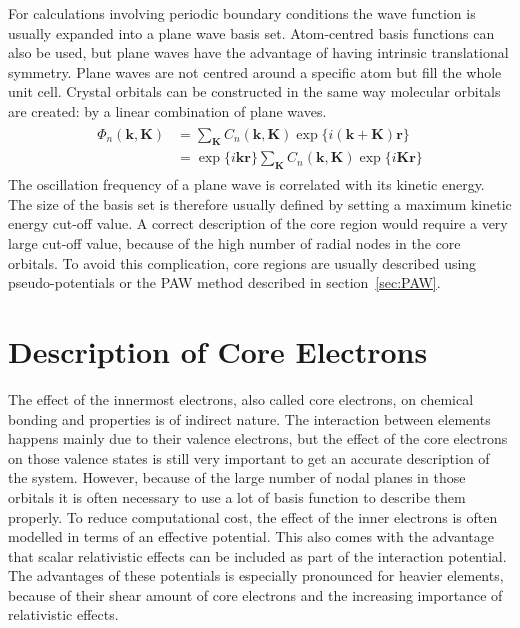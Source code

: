 For calculations involving periodic boundary conditions the wave function is
usually expanded into a plane wave basis set. Atom-centred basis functions can
also be used, but plane waves have the advantage of having intrinsic
translational symmetry. Plane waves are not centred around a specific atom but
fill the whole unit cell. Crystal orbitals can be constructed in the same way
molecular orbitals are created: by a linear combination of plane waves.
%
\begin{align}
    \begin{aligned}
        \Phi_n(\mathbf{k},\mathbf{K})&=\sum_\mathbf{K} C_n(\mathbf{k},\mathbf{K})\exp\{i(\mathbf{k}+\mathbf{K})\mathbf{r}\}\\
        &=\exp\{i\mathbf{k}\mathbf{r}\}\sum_\mathbf{K} C_n(\mathbf{k},\mathbf{K}) \exp\{i\mathbf{K}\mathbf{r}\}
    \end{aligned}
\end{align}
%
The oscillation frequency of a plane wave is correlated with its kinetic
energy. The size of the basis set is therefore usually defined by setting a
maximum kinetic energy cut-off value. A correct description of the core region
would require a very large cut-off value, because of the high number of radial
nodes in the core orbitals. To avoid this complication, core regions are
usually described using pseudo-potentials or the \ac{PAW} method described in
section~\ref{sec:PAW}.

\section{Description of Core Electrons}
\label{sec:CoreElectrons}

The effect of the innermost electrons, also called core electrons, on chemical
bonding and properties is of indirect nature. The interaction between elements
happens mainly due to their valence electrons, but the effect of the core
electrons on those valence states is still very important to get an accurate
description of the system. However, because of the large number of nodal planes
in those orbitals it is often necessary to use a lot of basis function to
describe them properly. To reduce computational cost, the effect of the inner
electrons is often modelled in terms of an effective potential. This also comes
with the advantage that scalar relativistic effects can be included as part of
the interaction potential. The advantages of these potentials is especially
pronounced for heavier elements, because of their shear amount of core
electrons and the increasing importance of relativistic effects. 

